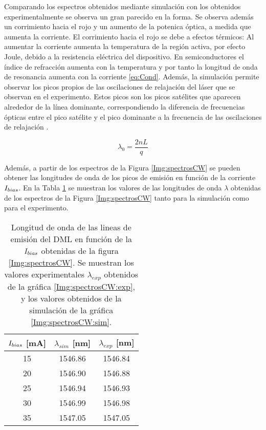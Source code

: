 		Comparando los espectros obtenidos mediante simulación con los obtenidos experimentalmente se observa un gran parecido en la forma. Se observa además un corrimiento hacia el rojo y un aumento de la potenica óptica, a medida que aumenta la corriente. El corrimiento hacia el rojo se debe a efectos térmicos: Al aumentar la corriente aumenta la temperatura de la región activa, por efecto Joule, debido a la resistencia eléctrica del dispositivo. En semiconductores el índice de refracción aumenta con la temperatura y por tanto la longitud de onda de resonancia aumenta con la corriente \ref{eq:Cond}. Además, la simulación permite observar los picos propios de las oscilaciones de relajación del láser que se observan en el experimento. Estos picos son los picos satélites que aparecen alrededor de la línea dominante, correspondiendo la diferencia de frecuencias ópticas entre el pico satélite y el pico dominante a la frecuencia de las oscilaciones de relajación \cite{van1995semiconductor}.

			\begin{equation}
				\lambda_0 = \frac{2nL}{q}
				\label{eq:Cond}
			\end{equation}

		Además, a partir de los espectros de la Figura \ref{Img:spectrosCW} se pueden obtener las longitudes de onda de los picos de emisión en función de la corriente $I_{bias}$. En la Tabla \ref{tab:lambdas} se muestran los valores de las longitudes de onda $\lambda$ obtenidas de los espectros de la Figura \ref{Img:spectrosCW} tanto para la simulación como para el experimento.

		\begin{table}[H]
			\centering
			\begin{tabular}{c c c}
				\hline
				$I_{bias}$ [mA] & $\lambda_{sim}$ [nm] & $\lambda_{exp}$ [nm] \\\hline 
				15 & 1546.86 & 1546.84 \\
				20 & 1546.90 & 1546.88 \\
				25 & 1546.94 & 1546.93 \\
				30 & 1546.99 & 1546.98 \\
				35 & 1547.05 & 1547.05 \\\hline
			\end{tabular}
			\caption{\label{tab:lambdas}Longitud de onda de las lineas de emisión del DML en función de la $I_{bias}$ obtenidas de la figura \ref{Img:spectrosCW}. Se muestran los valores experimentales $\lambda_{exp}$ obtenidos de la gráfica \ref{Img:spectrosCW:exp}, y los valores obtenidos de la simulación de la gráfica \ref{Img:spectrosCW:sim}.}
		\end{table}

